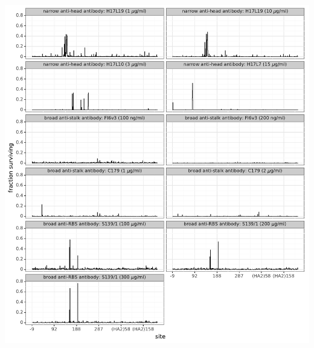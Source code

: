 \documentclass[11pt]{article}
\begin{document}
\begin{suppfigure}
\centerline{\includegraphics[width=\textwidth]{figs/maxfracsurvive.pdf}}
\caption{\label{suppfig:maxfracsurvive}
{\bf The excess fraction surviving for the single strongest escape mutation at each site.}
This plot differs from Figure~\ref{fig:avgfracsurvive} in that the height of the line indicates the excess fraction of virions that survive the antibody selection for the single strongest escape mutation at that site, rather than the average across all amino-acid mutations at that site.
}
\end{suppfigure}
\end{document}
